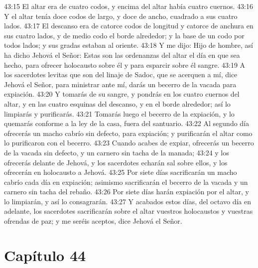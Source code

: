 43:15 El altar era de cuatro codos, y encima del altar había cuatro cuernos.   
43:16 Y el altar tenía doce codos   de largo, y doce de ancho, cuadrado a sus cuatro lados.   
43:17 El descanso era de catorce codos  de longitud y catorce de anchura en sus cuatro lados, y de medio codo el borde alrededor; y la base de un codo por todos lados; y sus gradas estaban al oriente. 
43:18 Y me dijo: Hijo de hombre, así ha dicho Jehová el Señor: Estas son las ordenanzas del altar el día en que sea hecho, para ofrecer holocausto sobre él y para esparcir sobre él sangre.   
43:19 A los sacerdotes levitas que son del linaje de Sadoc, que se acerquen a mí, dice Jehová el Señor, para ministrar ante mí, darás un becerro de la vacada para expiación.   
43:20 Y tomarás de su sangre, y pondrás en los cuatro cuernos del altar, y en las cuatro esquinas del descanso, y en el borde alrededor; así lo limpiarás y purificarás. 
43:21 Tomarás luego el becerro de la expiación, y lo quemarás conforme a la ley de la casa, fuera del santuario.   
43:22 Al segundo día ofrecerás un macho cabrío sin defecto, para expiación; y purificarán el altar como lo purificaron con el becerro.   
43:23 Cuando acabes de expiar, ofrecerás un becerro de la vacada sin defecto, y un carnero sin tacha de la manada;   
43:24 y los ofrecerás delante de Jehová, y los sacerdotes echarán sal sobre ellos, y los ofrecerán en holocausto a Jehová.   
43:25 Por siete días sacrificarán un macho cabrío cada día en expiación; asimismo sacrificarán el becerro de la vacada y un carnero sin tacha del rebaño.   
43:26 Por siete días harán expiación por el altar, y lo limpiarán, y así lo consagrarán.   
43:27 Y acabados estos días, del octavo día en adelante, los sacerdotes sacrificarán sobre el altar vuestros holocaustos y vuestras ofrendas de paz; y me seréis aceptos, dice Jehová el Señor. 
\section*{Capítulo 44 } 
  
